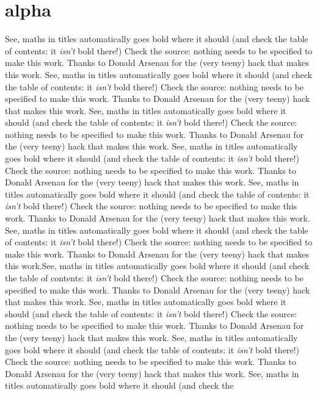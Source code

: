\section{alpha}
\label{sec:EqnTitle}
See, maths in titles automatically goes bold where it should (and check the 
table of contents: it \emph{isn't} bold there!) Check the source: nothing
needs to be specified to make this work. Thanks to Donald Arsenau for the
(very teeny) hack that makes this work.
See, maths in titles automatically goes bold where it should (and check the 
table of contents: it \emph{isn't} bold there!) Check the source: nothing
needs to be specified to make this work. Thanks to Donald Arsenau for the
(very teeny) hack that makes this work.
See, maths in titles automatically goes bold where it should (and check the 
table of contents: it \emph{isn't} bold there!) Check the source: nothing
needs to be specified to make this work. Thanks to Donald Arsenau for the
(very teeny) hack that makes this work.
See, maths in titles automatically goes bold where it should (and check the 
table of contents: it \emph{isn't} bold there!) Check the source: nothing
needs to be specified to make this work. Thanks to Donald Arsenau for the
(very teeny) hack that makes this work.
See, maths in titles automatically goes bold where it should (and check the 
table of contents: it \emph{isn't} bold there!) Check the source: nothing
needs to be specified to make this work. Thanks to Donald Arsenau for the
(very teeny) hack that makes this work.
See, maths in titles automatically goes bold where it should (and check the 
table of contents: it \emph{isn't} bold there!) Check the source: nothing
needs to be specified to make this work. Thanks to Donald Arsenau for the
(very teeny) hack that makes this work.See, maths in titles automatically goes bold where it should (and check the 
table of contents: it \emph{isn't} bold there!) Check the source: nothing
needs to be specified to make this work. Thanks to Donald Arsenau for the
(very teeny) hack that makes this work.
See, maths in titles automatically goes bold where it should (and check the 
table of contents: it \emph{isn't} bold there!) Check the source: nothing
needs to be specified to make this work. Thanks to Donald Arsenau for the
(very teeny) hack that makes this work.
See, maths in titles automatically goes bold where it should (and check the 
table of contents: it \emph{isn't} bold there!) Check the source: nothing
needs to be specified to make this work. Thanks to Donald Arsenau for the
(very teeny) hack that makes this work.
See, maths in titles automatically goes bold where it should (and check the 
